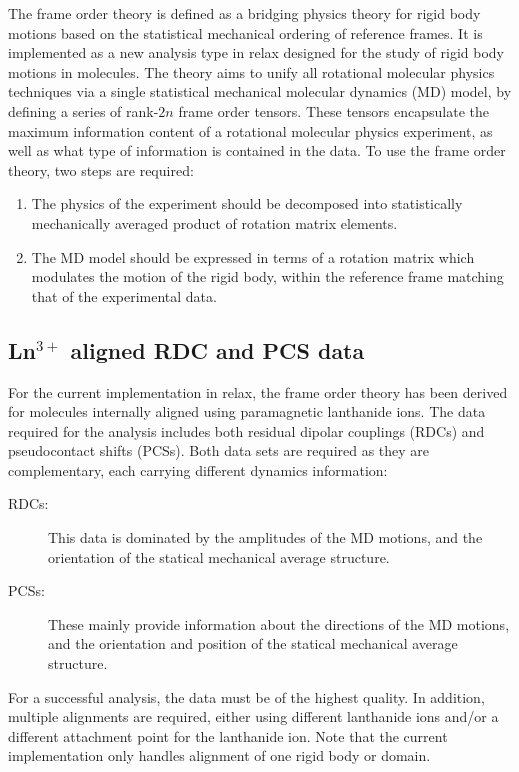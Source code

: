 The frame order theory is defined as a bridging physics theory for rigid body motions based on the statistical mechanical ordering of reference frames.
It is implemented as a new analysis type in relax designed for the study of rigid body motions in molecules.
The theory aims to unify all rotational molecular physics techniques via a single statistical mechanical molecular dynamics (MD) model, by defining a series of rank-$2n$ frame order tensors.
These tensors encapsulate the maximum information content of a rotational molecular physics experiment, as well as what type of information is contained in the data.
To use the frame order theory, two steps are required:
\begin{enumerate}
\item The physics of the experiment should be decomposed into statistically mechanically averaged product of rotation matrix elements.
\item The MD model should be expressed in terms of a rotation matrix which modulates the motion of the rigid body, within the reference frame matching that of the experimental data.
\end{enumerate}





\subsection{Ln$^{3+}$ aligned RDC and PCS data}

For the current implementation in relax, the frame order theory has been derived for molecules internally aligned using paramagnetic lanthanide ions.
The data required for the analysis includes both residual dipolar couplings (RDCs) and pseudocontact shifts (PCSs).
Both data sets are required as they are complementary, each carrying different dynamics information:
\begin{description}
\item[RDCs:]  This data is dominated by the amplitudes of the MD motions, and the orientation of the statical mechanical average structure.
\item[PCSs:]  These mainly provide information about the directions of the MD motions, and the orientation and position of the statical mechanical average structure.
\end{description}

For a successful analysis, the data must be of the highest quality.
In addition, multiple alignments are required, either using different lanthanide ions and/or a different attachment point for the lanthanide ion.
Note that the current implementation only handles alignment of one rigid body or domain.
